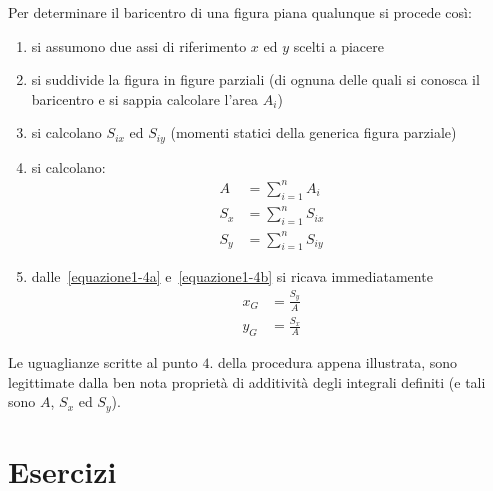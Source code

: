 \noindent Per determinare il baricentro di una figura piana qualunque si procede così:
\begin{enumerate}
\item si assumono due assi di riferimento $x$ ed $y$ scelti a piacere
\item si suddivide la figura in figure parziali (di ognuna delle quali si conosca il baricentro e si sappia calcolare l'area $A_i$)
\item si calcolano $S_{ix}$ ed $S_{iy}$ (momenti statici della generica figura parziale)
\item si calcolano:
\begin{align*}
A    &= \sum_{i=1}^n A_i \\
S_x &= \sum_{i=1}^n S_{ix} \\
S_y &= \sum_{i=1}^n S_{iy}
\end{align*}
\item dalle~\eqref{equazione1-4a} e~\eqref{equazione1-4b} si ricava immediatamente 
\begin{align} 
x_G    &= \frac{S_y}{A} \tag{1.5a} \label{equazione1-5a} \\
y_G    &= \frac{S_x}{A} \tag{1.5b} \label{equazione1-5b}
\end{align}
\end{enumerate}

\noindent Le uguaglianze scritte al punto $4.$ della procedura appena illustrata, sono legittimate dalla ben nota proprietà di additività degli integrali definiti (e tali sono $A$, $S_x$ ed $S_y$).
\clearpage
\section{Esercizi}
